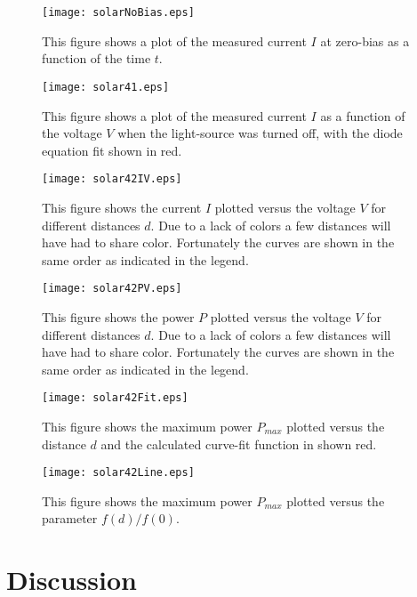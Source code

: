 \documentclass[a4paper]{article}
\begin{document}
\begin{figure}
\centering
\texttt{[image: solarNoBias.eps]}
\caption{\label{no_bias}This figure shows a plot of the measured current $I$ at zero-bias as a function of the time $t$. }
\end{figure}



\begin{figure}
\centering
\texttt{[image: solar41.eps]}
\caption{\label{solar41}This figure shows a plot of the measured current $I$ as a function of the voltage $V$ when the light-source was turned off, with the diode equation fit shown in red. }
\end{figure}


\begin{figure}[h]
\centering
\texttt{[image: solar42IV.eps]}
\caption{\label{solar42IV}This figure shows the current $I$ plotted versus the voltage $V$ for different distances $d$. Due to a lack of colors a few distances will have had to share color. Fortunately the curves are shown in the same order as indicated in the legend.}
\end{figure}


\begin{figure}[h]
\centering
\texttt{[image: solar42PV.eps]}
\caption{\label{solar42PV}This figure shows the power $P$ plotted versus the voltage $V$ for different distances $d$. Due to a lack of colors a few distances will have had to share color. Fortunately the curves are shown in the same order as indicated in the legend.}
\end{figure}


\begin{figure}[h]
\centering
\texttt{[image: solar42Fit.eps]}
\caption{\label{solar42Fit}This figure shows the maximum power $P_{max}$ plotted versus the distance $d$ and the calculated curve-fit function in shown red.}
\end{figure}


\begin{figure}[h]
\centering
\texttt{[image: solar42Line.eps]}
\caption{\label{solar42Line}This figure shows the maximum power $P_{max}$ plotted versus the parameter $f(d) / f(0)$.}
\end{figure}

\clearpage

\section{Discussion}
\end{document}
